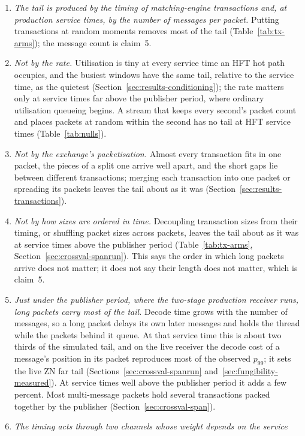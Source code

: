 \documentclass[11pt]{article}
\begin{document}
\begin{enumerate}
    \item \emph{The tail is produced by the timing of matching-engine transactions and, at
production service times, by the number of messages per packet.} Putting transactions at
random moments removes most of the tail (Table~\ref{tab:tx-arms}); the message count is
claim~5.
    \item \emph{Not by the rate.} Utilisation is tiny at every service time an HFT hot path
occupies, and the busiest windows have the same tail, relative to the service time, as
the quietest (Section~\ref{sec:results-conditioning}); the rate matters only at service
times far above the publisher period, where ordinary utilisation queueing begins. A
stream that keeps every second's packet count and places packets at random within the
second has no tail at HFT service times (Table~\ref{tab:nulls}).
    \item \emph{Not by the exchange's packetisation.} Almost every transaction fits in one
packet, the pieces of a split one arrive well apart, and the short gaps lie between
different transactions; merging each transaction into one packet or spreading its
packets leaves the tail about as it was (Section~\ref{sec:results-transactions}).
    \item \emph{Not by how sizes are ordered in time.} Decoupling transaction sizes from
their timing, or shuffling packet sizes across packets, leaves the tail about as it was
at service times above the publisher period (Table~\ref{tab:tx-arms},
Section~\ref{sec:crossval-spanrun}). This says the order in which long packets arrive does
not matter; it does not say their length does not matter, which is claim~5.
    \item \emph{Just under the publisher period, where the two-stage production receiver
runs, long packets carry most of the tail.} Decode time grows with the number of messages, so a long packet delays its
own later messages and holds the thread while the packets behind it queue. At that
service time this is about two thirds of the simulated tail, and on the live receiver the
decode cost of a message's position in its packet reproduces most of the observed
$p_{99}$; it sets the live ZN far tail (Sections~\ref{sec:crossval-spanrun}
and~\ref{sec:fungibility-measured}). At service times well above the publisher period it adds a few
percent. Most multi-message packets hold several transactions packed together by the
publisher (Section~\ref{sec:crossval-span}).
    \item \emph{The timing acts through two channels whose weight depends on the service
}
\end{enumerate}
\end{document}
